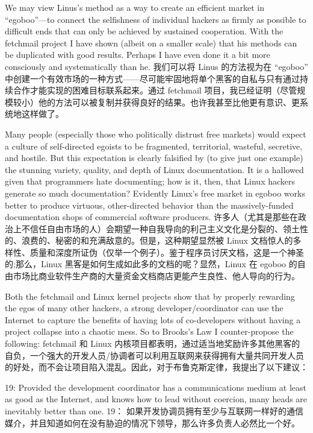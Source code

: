 \documentclass[a4paper,12pt,UTF8,twoside]{ctexbook}
\begin{document}
We may view Linus's method as a way to create an efficient market in ``egoboo''—to connect the selfishness of individual hackers as firmly as possible to difficult ends that can only be achieved by sustained cooperation. With the fetchmail project I have shown (albeit on a smaller scale) that his methods can be duplicated with good results. Perhaps I have even done it a bit more consciously and systematically than he.
我们可以将 Linus 的方法视为在 “egoboo” 中创建一个有效市场的一种方式——尽可能牢固地将单个黑客的自私与只有通过持续合作才能实现的困难目标联系起来。通过 fetchmail 项目，我已经证明（尽管规模较小）他的方法可以被复制并获得良好的结果。也许我甚至比他更有意识、更系统地这样做了。

Many people (especially those who politically distrust free markets) would expect a culture of self-directed egoists to be fragmented, territorial, wasteful, secretive, and hostile. But this expectation is clearly falsified by (to give just one example) the stunning variety, quality, and depth of Linux documentation. It is a hallowed given that programmers hate documenting; how is it, then, that Linux hackers generate so much documentation? Evidently Linux's free market in egoboo works better to produce virtuous, other-directed behavior than the massively-funded documentation shops of commercial software producers.
许多人（尤其是那些在政治上不信任自由市场的人）会期望一种自我导向的利己主义文化是分裂的、领土性的、浪费的、秘密的和充满敌意的。但是，这种期望显然被 Linux 文档惊人的多样性、质量和深度所证伪（仅举一个例子）。鉴于程序员讨厌文档，这是一个神圣的;那么，Linux 黑客是如何生成如此多的文档的呢？显然，Linux 在 egoboo 的自由市场比商业软件生产商的大量资金文档商店更能产生良性、他人导向的行为。

Both the fetchmail and Linux kernel projects show that by properly rewarding the egos of many other hackers, a strong developer/coordinator can use the Internet to capture the benefits of having lots of co-developers without having a project collapse into a chaotic mess. So to Brooks's Law I counter-propose the following:
fetchmail 和 Linux 内核项目都表明，通过适当地奖励许多其他黑客的自负，一个强大的开发人员/协调者可以利用互联网来获得拥有大量共同开发人员的好处，而不会让项目陷入混乱。因此，对于布鲁克斯定律，我提出了以下建议：

19: Provided the development coordinator has a communications medium at least as good as the Internet, and knows how to lead without coercion, many heads are inevitably better than one.
19： 如果开发协调员拥有至少与互联网一样好的通信媒介，并且知道如何在没有胁迫的情况下领导，那么许多负责人必然比一个好。
\end{document}
